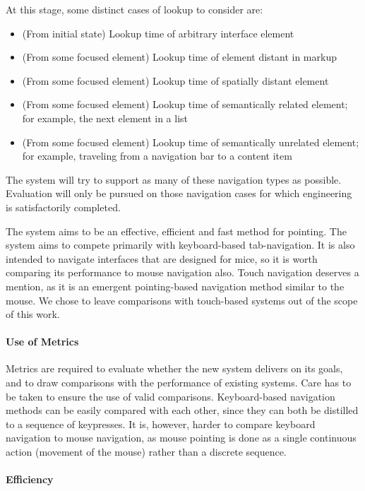 \documentclass[a4paper, 11pt]{article}
\begin{document}
At this stage, some distinct cases of lookup to consider are:
\begin{itemize}
\item (From initial state) Lookup time of arbitrary interface element
\item (From some focused element) Lookup time of element distant in markup
\item (From some focused element) Lookup time of spatially distant element
\item (From some focused element) Lookup time of semantically related element; for example, the next element in a list
\item (From some focused element) Lookup time of semantically unrelated element; for example, traveling from a navigation bar to a content item
\end{itemize}
The system will try to support as many of these navigation types as possible. Evaluation will only be pursued on those navigation cases for which engineering is satisfactorily completed.

The system aims to be an effective, efficient and fast method for pointing.
The system aims to compete primarily with keyboard-based tab-navigation. It is also intended to navigate interfaces that are designed for mice, so it is worth comparing its performance to mouse navigation also.
Touch navigation deserves a mention, as it is an emergent pointing-based navigation method similar to the mouse. We chose to leave comparisons with touch-based systems out of the scope of this work.

\paragraph{Use of Metrics}
\label{useofmetrics}
Metrics are required to evaluate whether the new system delivers on its goals, and to draw comparisons with the performance of existing systems. Care has to be taken to ensure the use of valid comparisons. Keyboard-based navigation methods can be easily compared with each other, since they can both be distilled to a sequence of keypresses. It is, however, harder to compare keyboard navigation to mouse navigation, as mouse pointing is done as a single continuous action (movement of the mouse) rather than a discrete sequence.

\paragraph{Efficiency}
\label{efficiency}
\end{document}
